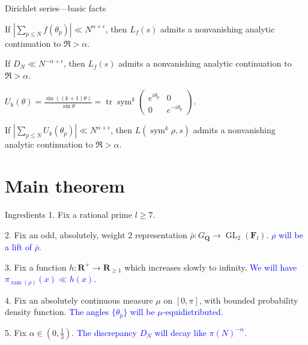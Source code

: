 \documentclass[handout]{beamer}
\DeclareMathOperator{\GL}{GL}
\DeclareMathOperator{\ram}{ram}
\DeclareMathOperator{\sym}{sym}
\DeclareMathOperator{\tr}{tr}
\newcommand{\bF}{\mathbf{F}}
\newcommand{\bQ}{\mathbf{Q}}
\newcommand{\bR}{\mathbf{R}}
\begin{document}
\begin{frame}{Dirichlet series---basic facts}
\begin{theorem}
If $\left| \sum_{p\leqslant N} f(\theta_p)\right| \ll N^{\alpha+\epsilon}$, 
then $L_f(s)$ admits a nonvanishing analytic continuation to $\Re > \alpha$. 
\end{theorem}
\pause

\begin{corollary}
If $D_N \ll N^{-\alpha+\epsilon}$, then $L_f(s)$ admits a nonvanishing 
analytic continuation to $\Re > \alpha$. 
\end{corollary}
\pause

\begin{definition}
$U_k(\theta) = \frac{\sin((k+1)\theta)}{\sin\theta} = \tr\sym^k \left(\begin{smallmatrix} e^{i \theta_p} & 0\\ 0 & e^{-i \theta_p}\end{smallmatrix}\right)$.
\end{definition}
\pause

\begin{theorem}
If $\left| \sum_{p\leqslant N} U_k(\theta_p)\right| \ll N^{\alpha+\epsilon}$, 
then $L(\sym^k\rho, s)$ admits a nonvanishing analytic continuation to 
$\Re > \alpha$. 
\end{theorem}
\end{frame}





\section{Main theorem}


\begin{frame}{Ingredients}
1. Fix a rational prime $l\geqslant 7$. 
\pause

2. Fix an odd, absolutely, weight 2 representation 
$\bar\rho\colon G_\bQ \to \GL_2(\bF_l)$.
\pause
\textcolor{blue}{$\rho$ will be a lift of $\bar\rho$.}
\pause

3. Fix a function $h\colon \bR^+ \to \bR_{\geqslant 1}$ which increases slowly 
to infinity. 
\pause
\textcolor{blue}{We will have $\pi_{\ram(\rho)}(x) \ll h(x)$.}
\pause

4. Fix an absolutely continuous measure $\mu$ on $[0,\pi]$, with bounded 
probability density function.
\pause
\textcolor{blue}{The angles $\{\theta_p\}$ will be $\mu$-equidistributed.}
\pause

5. Fix $\alpha\in \left(0,\frac 1 3\right)$. 
\pause
\textcolor{blue}{The discrepancy $D_N$ will decay like $\pi(N)^{-\alpha}$.}
\end{frame}
\end{document}
